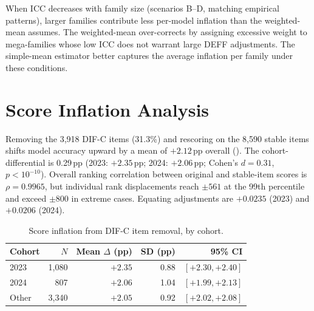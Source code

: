 \begin{table}[h]
\centering
\caption{DEFF estimator comparison across four simulated family structures. Bias = adjusted C\% $-$ ground truth (30\%); RMSE over 50 seeds. Simple-mean wins in 3/4 scenarios; weighted-mean ties only under uniform family sizes.}
\label{tab:deff_sim}
\small
{}
\end{table}

When ICC decreases with family size (scenarios B--D, matching empirical patterns), larger families contribute less per-model inflation than the weighted-mean assumes. The weighted-mean over-corrects by assigning excessive weight to mega-families whose low ICC does not warrant large DEFF adjustments. The simple-mean estimator better captures the average inflation per family under these conditions.

\section{Score Inflation Analysis}
\label{app:score_inflation}

Removing the 3,918 DIF-C items (31.3\%) and rescoring on the 8,590 stable items shifts model accuracy upward by a mean of ${+}2.12$\,pp overall (). The cohort-differential is 0.29\,pp (2023: ${+}2.35$\,pp; 2024: ${+}2.06$\,pp; Cohen's $d = 0.31$, $p < 10^{-10}$). Overall ranking correlation between original and stable-item scores is $\rho = 0.9965$, but individual rank displacements reach ${\pm}561$ at the 99th percentile and exceed ${\pm}800$ in extreme cases. Equating adjustments are ${+}0.0235$ (2023) and ${+}0.0206$ (2024).

\begin{table}[h]
\centering
\caption{Score inflation from DIF-C item removal, by cohort.}
\label{tab:score_inflation}
\small
\begin{tabular}{lrrrr}
\toprule
Cohort & $N$ & Mean $\Delta$ (pp) & SD (pp) & 95\% CI \\
\midrule
2023 & 1,080 & ${+}2.35$ & 0.88 & $[{+}2.30, {+}2.40]$ \\
2024 & 807 & ${+}2.06$ & 1.04 & $[{+}1.99, {+}2.13]$ \\
Other & 3,340 & ${+}2.05$ & 0.92 & $[{+}2.02, {+}2.08]$ \\
\bottomrule
\end{tabular}
\end{table}

